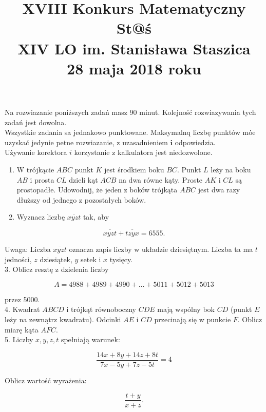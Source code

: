 \documentclass[10pt]{article}
\title{XVIII Konkurs Matematyczny St@ś \\
 XIV LO im. Stanisława Staszica \\
 28 maja 2018 roku }
\author{}
\date{}
\begin{document}
\maketitle
Na rozwiazanie poniższych zadań masz 90 minut. Kolejność rozwiazywania tych zadań jest dowolna.\\
Wszystkie zadania sa jednakowo punktowane. Maksymalnq liczbę punktów mȯ̇e uzyskać jedynie petne rozwiazanie, z uzasadnieniem \(\boldsymbol{i}\) odpowiedzia.\\
Używanie korektora \(i\) korzystanie z kalkulatora jest niedozwolone.

\begin{enumerate}
  \item W trójkącie \(A B C\) punkt \(K\) jest środkiem boku \(B C\). Punkt \(L\) leży na boku \(A B\) i prosta \(C L\) dzieli kąt \(A C B\) na dwa równe kąty. Proste \(A K\) i \(C L\) są prostopadłe. Udowodnij, że jeden z boków trójkąta \(A B C\) jest dwa razy dłuższy od jednego z pozostałych boków.
  \item Wyznacz liczbę \(\overline{x y z t}\) tak, aby
\end{enumerate}

\[
\overline{x y z t}+\overline{t z y x}=6555 .
\]

Uwaga: Liczba \(\overline{x y z t}\) oznacza zapis liczby w układzie dziesiętnym. Liczba ta ma \(t\) jedności, \(z\) dziesiątek, \(y\) setek i \(x\) tysięcy.\\
3. Oblicz resztę z dzielenia liczby

\[
A=4988+4989+4990+\ldots+5011+5012+5013
\]

przez 5000.\\
4. Kwadrat \(A B C D\) i trójkąt równoboczny \(C D E\) mają wspólny bok \(C D\) (punkt \(E\) leży na zewnątrz kwadratu). Odcinki \(A E\) i \(C D\) przecinają się w punkcie \(F\). Oblicz miarę kąta \(A F C\).\\
5. Liczby \(x, y, z, t\) spełniają warunek:

\[
\frac{14 x+8 y+14 z+8 t}{7 x-5 y+7 z-5 t}=4
\]

Oblicz wartość wyrażenia:

\[
\frac{t+y}{x+z} .
\]
\end{document}
